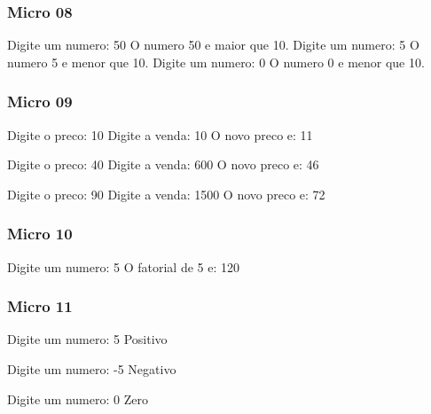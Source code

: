 \documentclass[12pt,a4paper,twoside]{report}
\begin{document}
\subsubsection{Micro 08}


\begin{terminal}
Digite um numero: 50
O numero 50 e maior que 10.
Digite um numero: 5
O numero 5 e menor que 10.
Digite um numero: 0
O numero 0 e menor que 10.
\end{terminal}

\subsubsection{Micro 09}


\begin{terminal}
Digite o preco: 10
Digite a venda: 10
O novo preco e: 11

Digite o preco: 40
Digite a venda: 600
O novo preco e: 46

Digite o preco: 90
Digite a venda: 1500
O novo preco e: 72
\end{terminal}

\subsubsection{Micro 10}


\begin{terminal}
Digite um numero: 5
O fatorial de 5 e: 120
\end{terminal}

\subsubsection{Micro 11}


\begin{terminal}
Digite um numero: 5
Positivo

Digite um numero: -5
Negativo

Digite um numero: 0
Zero
\end{terminal}
\end{document}

